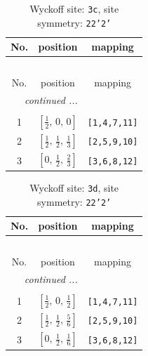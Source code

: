 \documentclass[fleqn,8pt]{jsarticle}
\begin{document}
\renewcommand{\arraystretch}{1.2}
\begin{longtable}{ccc}
\caption{Wyckoff site: {\tt 3c}, site symmetry: {\tt 22'2'}}
 \\
 \hline \hline
No. & position & mapping \\ \hline \endfirsthead

\multicolumn{2}{l}{\tablename\ \thetable{}} \\
 \hline \hline
No. & position & mapping \\ \hline \endhead

 \hline \hline
\multicolumn{2}{r}{\footnotesize\it continued ...} \\ \endfoot

 \hline \hline
\multicolumn{2}{r}{} \\ \endlastfoot

1 & $\left[ \frac{1}{2},\, 0,\, 0 \right]$ & {\tt [1,4,7,11]} \\ \hline
2 & $\left[ \frac{1}{2},\, \frac{1}{2},\, \frac{1}{3} \right]$ & {\tt [2,5,9,10]} \\ \hline
3 & $\left[ 0,\, \frac{1}{2},\, \frac{2}{3} \right]$ & {\tt [3,6,8,12]} \\
\end{longtable}
\renewcommand{\arraystretch}{1.2}
\begin{longtable}{ccc}
\caption{Wyckoff site: {\tt 3d}, site symmetry: {\tt 22'2'}}
 \\
 \hline \hline
No. & position & mapping \\ \hline \endfirsthead

\multicolumn{2}{l}{\tablename\ \thetable{}} \\
 \hline \hline
No. & position & mapping \\ \hline \endhead

 \hline \hline
\multicolumn{2}{r}{\footnotesize\it continued ...} \\ \endfoot

 \hline \hline
\multicolumn{2}{r}{} \\ \endlastfoot

1 & $\left[ \frac{1}{2},\, 0,\, \frac{1}{2} \right]$ & {\tt [1,4,7,11]} \\ \hline
2 & $\left[ \frac{1}{2},\, \frac{1}{2},\, \frac{5}{6} \right]$ & {\tt [2,5,9,10]} \\ \hline
3 & $\left[ 0,\, \frac{1}{2},\, \frac{1}{6} \right]$ & {\tt [3,6,8,12]} \\
\end{longtable}
\renewcommand{\arraystretch}{1.2}
\end{document}
